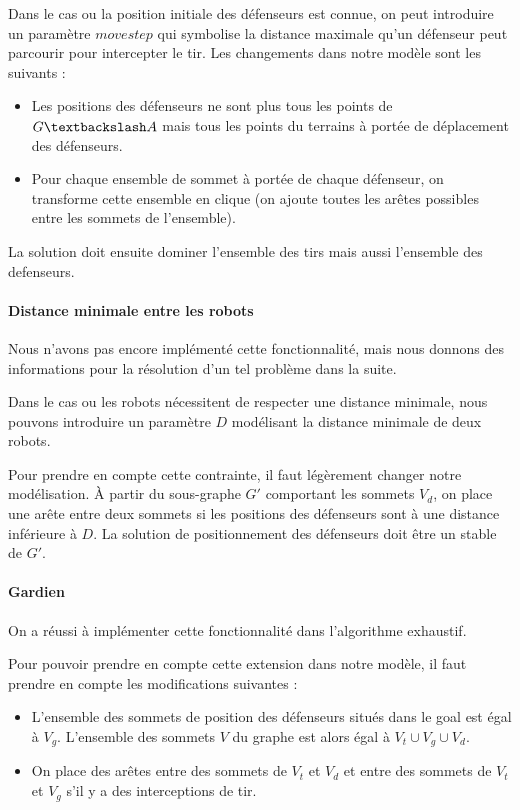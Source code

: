 \documentclass[12pt]{article}
\begin{document}
Dans le cas ou la position initiale des défenseurs est connue, on peut introduire un paramètre $movestep$ qui symbolise la distance maximale qu'un défenseur peut parcourir pour intercepter le tir. Les changements dans notre modèle sont les suivants :

\begin{itemize}
  \item Les positions des défenseurs ne sont plus tous les points de $G \textbackslash A$ mais tous les points du terrains à portée de déplacement des défenseurs.
  \item Pour chaque ensemble de sommet à portée de chaque défenseur, on transforme cette ensemble en clique (on ajoute toutes les arêtes possibles entre les sommets de l'ensemble).
\end{itemize}

La solution doit ensuite dominer l'ensemble des tirs mais aussi l'ensemble des defenseurs.

\paragraph{Distance minimale entre les robots} Nous n'avons pas encore implémenté cette fonctionnalité, mais nous donnons des informations pour la résolution d'un tel problème dans la suite.

Dans le cas ou les robots nécessitent de respecter une distance minimale, nous pouvons introduire un paramètre $D$ modélisant la distance minimale de deux robots.

Pour prendre en compte cette contrainte, il faut légèrement changer notre modélisation. À partir du sous-graphe $G'$ comportant les sommets $V_d$, on place une arête entre deux sommets si les positions des défenseurs sont à une distance inférieure à $D$. La solution de positionnement des défenseurs doit être un stable de $G'$.


\paragraph{Gardien}
On a réussi à implémenter cette fonctionnalité dans l'algorithme exhaustif.

Pour pouvoir prendre en compte cette extension dans notre modèle, il faut prendre en compte les modifications suivantes :
\begin{itemize}
  \item L'ensemble des sommets de position des défenseurs situés dans le goal est égal à $V_g$. L'ensemble des sommets $V$ du graphe est alors égal à $V_t \cup V_g \cup V_d$.
  \item On place des arêtes entre des sommets de $V_t$ et $V_d$ et entre des sommets de $V_t$ et $V_g$ s'il y a des interceptions de tir.
\end{itemize}
\end{document}
